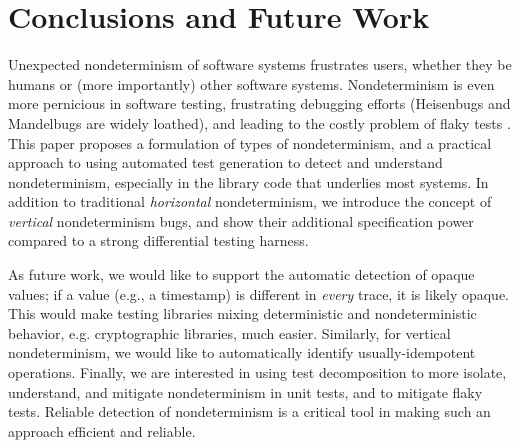 \section{Conclusions and Future Work}

Unexpected nondeterminism of software systems frustrates users,
whether they be humans or (more importantly) other software systems.
Nondeterminism is even more pernicious in software testing,
frustrating debugging efforts (Heisenbugs \cite{Heisenbug} and
Mandelbugs \cite{GrottkeBugs,FaultTriggers} are widely loathed), and
leading to the costly problem of flaky tests
\cite{miccoflaky,listfieldtestanalysis}.
This paper proposes a formulation of types of nondeterminism, and a
practical approach to using automated test generation to detect and understand
nondeterminism, especially in the library code that underlies most
systems. In addition to traditional \emph{horizontal} nondeterminism, we introduce
the concept of \emph{vertical} nondeterminism bugs, and show their
additional specification power compared to a
strong differential testing harness.  
\begin{comment}
We implemented our approach in the
TSTL automated test generation system for Python, and demonstrated the
simplicity and utility of the approach on real-world examples.
\end{comment}

As future work, we would like to support the automatic detection of opaque
values; if a value (e.g., a timestamp) is different in \emph{every}
trace, it is likely opaque.  This would make
testing libraries mixing deterministic and nondeterministic
behavior, e.g. cryptographic libraries, much easier. Similarly, for
vertical nondeterminism, we would like to
automatically identify usually-idempotent operations.
Finally, we are interested in using test decomposition
\cite{Composition} to more isolate, understand, and mitigate
nondeterminism in unit tests, and to mitigate flaky tests.
Reliable detection of nondeterminism is a critical tool in making such
an approach efficient and reliable.

